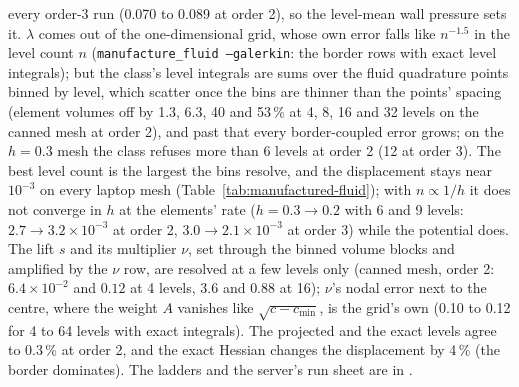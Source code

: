 \documentclass[11pt]{article}
\numberwithin{equation}{section}
\newcommand{\code}[1]{\texttt{#1}}
\begin{document}
every order-3 run (0.070 to 0.089 at order 2), so the level-mean wall
pressure sets it. $\lambda$ comes out of the one-dimensional grid, whose own
error falls like $n^{-1.5}$ in the level count $n$
(\code{manufacture\_fluid --galerkin}: the border rows with exact level
integrals); but the class's level integrals are sums over the fluid
quadrature points binned by level, which scatter once the bins are thinner
than the points' spacing (element volumes off by 1.3, 6.3, 40 and 53\,\% at
4, 8, 16 and 32 levels on the canned mesh at order 2), and past that every
border-coupled error grows; on the $h=0.3$ mesh the class refuses more than
6 levels at order 2 (12 at order 3). The best level count is the largest the
bins resolve, and the displacement stays near $10^{-3}$ on every laptop mesh
(Table~\ref{tab:manufactured-fluid}); with $n\propto1/h$ it does not
converge in $h$ at the elements' rate ($h=0.3\to0.2$ with 6 and 9 levels:
$2.7\to3.2\times10^{-3}$ at order 2, $3.0\to2.1\times10^{-3}$ at order 3)
while the potential does. The lift $s$ and its multiplier $\nu$, set through
the binned volume blocks and amplified by the $\nu$ row, are resolved at a
few levels only (canned mesh, order 2: $6.4\times10^{-2}$ and $0.12$ at 4
levels, $3.6$ and $0.88$ at 16); $\nu$'s nodal error next to the centre,
where the weight $A$ vanishes like $\sqrt{c-c_{\min}}$, is the grid's own
(0.10 to 0.12 for 4 to 64 levels with exact integrals). The projected and
the exact levels agree to 0.3\,\% at order 2, and the exact Hessian changes
the displacement by 4\,\% (the border dominates). The ladders and the
server's run sheet are in .
\end{document}
